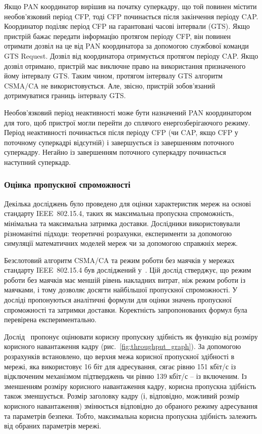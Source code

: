 \documentclass[a4paper,ukrainian,utf8,nocolumnsxix,floatsection,equationsection]{eskdtext}
\renewcommand\paragraph{\subsubsection}
\newcommand{\figref}[1]{рис.~\ref{#1}}
\newcommand{\iee}[0]{IEEE~802.15.4\xspace}
\newcommand{\csma}[0]{CSMA/CA\xspace}
\begin{document}
Якщо PAN координатор вирішив на початку суперкадру, що  той повинен містити необов’язковий період CFP, тоді CFP починається після закінчення періоду CAP. Координатор поділяє період CFP на гарантовані часові інтервали (GTS). Якщо пристрій бажає передати інформацію протягом періоду CFP, він повинен отримати дозвіл на це від PAN координатора за допомогою службової команди GTS Request. Дозвіл від координатора отримується протягом періоду CAP. Якщо дозвіл отримано, пристрій має виключне право на використання призначеного йому інтервалу GTS. Таким чином, протягом інтервалу GTS алгоритм \csma не використовується. Але, звісно, пристрій зобов’язаний дотримуватися границь інтервалу GTS. 

Необов’язковий період неактивності може бути назначений PAN координатором для того, щоб пристрої могли перейти до сплячого енергозберігаючого режиму. Період неактивності починається після періоду CFP (чи CAP, якщо CFP у поточному суперкадрі відсутній) і завершується із завершенням поточного суперкадру.
Негайно із завершенням поточного суперкадру починається наступний суперкадр. 

\paragraph{Оцінка пропускної спроможності}
\label{par:throughput:evaluation}

Декілька досліджень було проведено для оцінки характеристик мереж на основі стандарту \iee, таких як максимальна пропускна спроможність, мінімальна та максимальна затримка доставки. Дослідники використовували різноманітні підходи: теоретичні розрахунки, експерименти за допомогою симуляції математичних моделей мереж чи за допомогою справжніх мереж.

Безслотовий алгоритм \csma та режим роботи без маячків у мережах стандарту \iee був досліджений у~\cite{thoroughput:analysis:unslotted:ieee}. Цій дослід стверджує, що режим роботи без маячків має меншій рівень накладних витрат, ніж режим роботи із маячками, і тому дозволяє досягти найбільшої пропускної спроможності. У досліді пропонуються аналітичні формули для оцінки значень пропускної спроможності та затримки доставки. Коректність запропонованих формул була перевірена експериментально.

Дослід~\cite{thoroughput:analysis:unslotted:ieee} пропонує оцінювати корисну пропускну здібність як функцію від розміру корисного навантаження кадру (\figref{fig:throughput_graph}). За допомогою розрахунків встановлено, що верхня межа корисної пропускної здібності в мережі, яка використовує 16 біт для адресування, сягає рівню 151 кбіт/с із відключеним механізмом підтверджень чи рівню 139 кбіт/с – із включеним. Із зменшенням розміру корисного навантаження кадру, корисна пропускна здібність також зменшується. Розмір заголовку кадру (і, відповідно, можливий розмір корисного навантаження) змінюється відповідно до обраного режиму адресування та параметрів безпеки. Тобто, максимальна корисна пропускна здібність залежить від обраних параметрів мережі.
\end{document}
